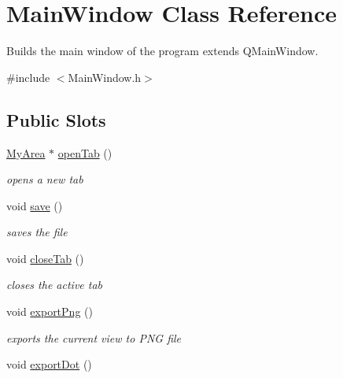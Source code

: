 \hypertarget{class_main_window}{\section{\-Main\-Window \-Class \-Reference}
\label{class_main_window}
}


\-Builds the main window of the program extends \-Q\-Main\-Window.  




{\ttfamily \#include $<$\-Main\-Window.\-h$>$}

\subsection*{\-Public \-Slots}
\begin{DoxyCompactItemize}
\item 
\hyperlink{class_my_area}{\-My\-Area} $\ast$ \hyperlink{class_main_window_a3ecd23a0dc61406e34522af9aae150bb}{open\-Tab} ()
\begin{DoxyCompactList}\small\item\em opens a new tab \end{DoxyCompactList}\item 
\hypertarget{class_main_window_a3ba1a371fb10e731ae0926ae85efeb4f}{void \hyperlink{class_main_window_a3ba1a371fb10e731ae0926ae85efeb4f}{save} ()}\label{class_main_window_a3ba1a371fb10e731ae0926ae85efeb4f}

\begin{DoxyCompactList}\small\item\em saves the file \end{DoxyCompactList}\item 
\hypertarget{class_main_window_af622a541e4d87f86e9e83d29af60fe19}{void \hyperlink{class_main_window_af622a541e4d87f86e9e83d29af60fe19}{close\-Tab} ()}\label{class_main_window_af622a541e4d87f86e9e83d29af60fe19}

\begin{DoxyCompactList}\small\item\em closes the active tab \end{DoxyCompactList}\item 
\hypertarget{class_main_window_a111875a1d82e77178636322ab485e4bb}{void \hyperlink{class_main_window_a111875a1d82e77178636322ab485e4bb}{export\-Png} ()}\label{class_main_window_a111875a1d82e77178636322ab485e4bb}

\begin{DoxyCompactList}\small\item\em exports the current view to \-P\-N\-G file \end{DoxyCompactList}\item 
\hypertarget{class_main_window_a0423cda4bfa3846796523893e2deb5f1}{void \hyperlink{class_main_window_a0423cda4bfa3846796523893e2deb5f1}{export\-Dot} ()}\label{class_main_window_a0423cda4bfa3846796523893e2deb5f1}


\end{DoxyCompactItemize}
